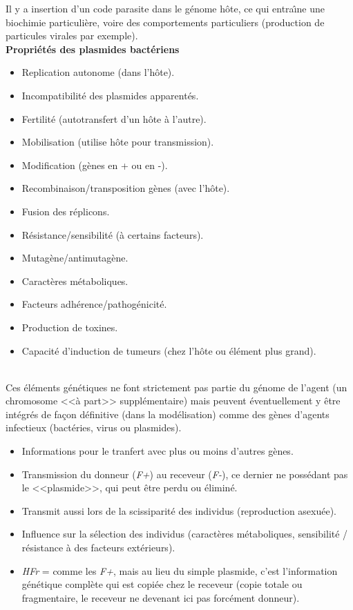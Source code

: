 \documentclass[11pt,twoside,a4paper]{article}
\begin{document}
Il y a insertion d'un code parasite dans le g{\'e}nome h{\^o}te, ce qui entra{\^\i}ne une biochimie particuli{\`e}re, voire des comportements particuliers (production de particules virales par exemple).~\\

\textbf{Propri{\'e}t{\'e}s des plasmides bact{\'e}riens}
\begin{itemize}
	\item Replication autonome (dans l'h{\^o}te). 
	\item Incompatibilit{\'e} des plasmides apparent{\'e}s. 
	\item Fertilit{\'e} (autotransfert d'un h{\^o}te {\`a} l'autre). 
	\item Mobilisation (utilise h{\^o}te pour transmission). 
	\item Modification (g{\`e}nes en + ou en -). 
	\item Recombinaison/transposition g{\`e}nes (avec l'h{\^o}te). 
	\item Fusion des r{\'e}plicons. 
	\item R{\'e}sistance/sensibilit{\'e} ({\`a} certains facteurs). 
	\item Mutag{\`e}ne/antimutag{\`e}ne. 
	\item Caract{\`e}res m{\'e}taboliques. 
	\item Facteurs adh{\'e}rence/pathog{\'e}nicit{\'e}. 
	\item Production de toxines. 
	\item Capacit{\'e} d'induction de tumeurs (chez l'h{\^o}te ou {\'e}l{\'e}ment plus grand). 
\end{itemize}~\\

Ces {\'e}l{\'e}ments g{\'e}n{\'e}tiques ne font strictement pas partie du g{\'e}nome de l'agent (un chromosome <<{\`a} part>> suppl{\'e}mentaire) mais peuvent {\'e}ventuellement y {\^e}tre int{\'e}gr{\'e}s de fa\c{c}on d{\'e}finitive (dans la mod{\'e}lisation) comme des g{\`e}nes d'agents infectieux (bact{\'e}ries, virus ou plasmides). 
\begin{itemize}
	\item Informations pour le tranfert avec plus ou moins d'autres g{\`e}nes. 
	\item Transmission du donneur (\textit{F+}) au receveur (\textit{F-}), ce dernier ne poss{\'e}dant pas le <<plasmide>>, qui peut {\^e}tre perdu ou {\'e}limin{\'e}. 
	\item Transmit aussi lors de la scissiparit{\'e} des individus (reproduction asexu{\'e}e). 
	\item Influence sur la s{\'e}lection des individus (caract{\`e}res m{\'e}taboliques, sensibilit{\'e} / r{\'e}sistance {\`a} des facteurs ext{\'e}rieurs). 
	\item \textit{HFr} = comme les \textit{F+}, mais au lieu du simple plasmide, c'est l'information g{\'e}n{\'e}tique compl{\`e}te qui est copi{\'e}e chez le receveur (copie totale ou fragmentaire, le receveur ne devenant ici pas forc{\'e}ment donneur). 
\end{itemize}
\end{document}
